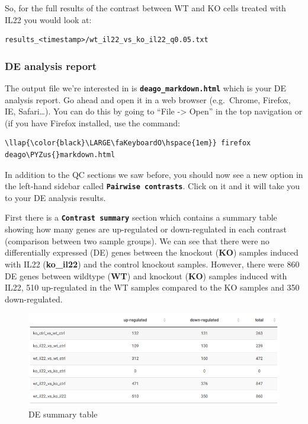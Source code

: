 \documentclass[11pt]{article}
\makeatletter
\def\maxwidth{\ifdim\Gin@nat@width>\linewidth\linewidth
    \else\Gin@nat@width\fi}
\let\Oldincludegraphics\includegraphics
\renewcommand{\includegraphics}[1]{\Oldincludegraphics[width=.8\maxwidth, height=.55\textheight, keepaspectratio]{#1}}
\def\PYZus{\char`\_}
\makeatother
\begin{document}
So, for the full results of the contrast between WT and KO cells treated
with IL22 you would look at:

\begin{verbatim}
results_<timestamp>/wt_il22_vs_ko_il22_q0.05.txt
\end{verbatim}

\hypertarget{de-analysis-report}{%
\subsubsection{DE analysis report}\label{de-analysis-report}}

The output file we're interested in is
\textbf{\texttt{deago\_markdown.html}} which is your DE analysis report.
Go ahead and open it in a web browser (e.g.~Chrome, Firefox, IE,
Safari\ldots{}). You can do this by going to ``File -\textgreater{}
Open'' in the top navigation or (if you have Firefox installed, use the
command:

\begin{terminalinput}
\begin{Verbatim}[commandchars=\\\{\}]
\llap{\color{black}\LARGE\faKeyboardO\hspace{1em}} firefox deago\PYZus{}markdown.html
\end{Verbatim}
\end{terminalinput}

    In addition to the QC sections we saw before, you should now see a new
option in the left-hand sidebar called
\textbf{\texttt{Pairwise\ contrasts}}. Click on it and it will take you
to your DE analysis results.

First there is a \textbf{\texttt{Contrast\ summary}} section which
contains a summary table showing how many genes are up-regulated or
down-regulated in each contrast (comparison between two sample groups).
We can see that there were no differentially expressed (DE) genes
between the knockout (\textbf{KO}) samples induced with IL22
(\textbf{ko\_il22}) and the control knockout samples. However, there
were 860 DE genes between wildtype (\textbf{WT}) and knockout
(\textbf{KO}) samples induced with IL22, 510 up-regulated in the WT
samples compared to the KO samples and 350 down-regulated.

    \begin{figure}[!h]
\centering
\includegraphics{images/DEsummary.png}
\caption{DE summary table}
\end{figure}
\end{document}
